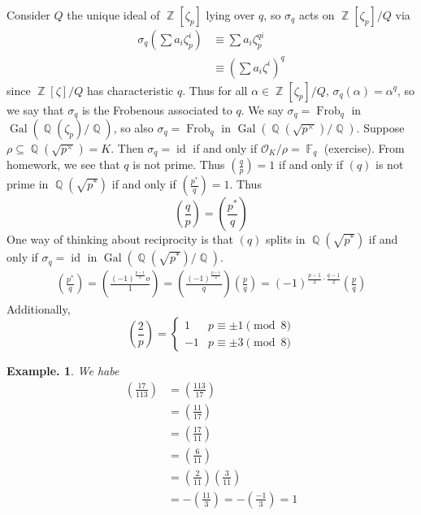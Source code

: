 \documentclass[11pt, a4paper]{memoir}
\DeclareMathOperator{\Q}{{\mathbb{Q}}}
\DeclareMathOperator{\Z}{{\mathbb{Z}}}
\DeclareMathOperator{\F}{{\mathbb{F}}}
\theoremstyle{change}
\theoremstyle{plain}
\theoremstyle{nonumberplain}
\newtheorem{example}{Example.}
\DeclareMathOperator{\Gal}{Gal}
\DeclareMathOperator{\id}{id}
\newcommand{\lgs}[2]{\ensuremath{\left(\frac{#1}{#2}\right)}}
\DeclareMathOperator{\Frob}{Frob}
\begin{document}
Consider $Q$ the unique ideal of $\Z[\zeta_p]$ lying over $q$, so $\sigma_q$ acts on $\Z[\zeta_p]/Q$ via
\begin{align*}
    \sigma_q\left(\sum a_i\zeta_p^i\right)&\equiv\sum a_i\zeta_p^{qi}\\
                                          &\equiv \left(\sum a_i\zeta^i\right)^q
\end{align*}
since $\Z[\zeta]/Q$ has characteristic $q$.
Thus for all $\alpha\in\Z[\zeta_p]/Q$, $\sigma_q(\alpha)=\alpha^q$, so we say that $\sigma_q$ is the Frobenous associated to $q$.
We say $\sigma_q=\Frob_q$ in $\Gal(\Q(\zeta_p)/\Q)$, so also $\sigma_q=\Frob_q$ in $\Gal(\Q(\sqrt{p^\times})/\Q)$.
Suppose $\rho\subseteq\Q(\sqrt{p^\times})=K$.
Then $\sigma_q=\id$ if and only if $\mathcal{O}_K/\rho=\F_q$ (exercise).
From homework, we see that $q$ is not prime.
Thus
$\lgs{q}{p}=1$ if and only if $(q)$ is not prime in $\Q(\sqrt{p^*})$ if and only if $\lgs{p^*}{q}=1$.
Thus
\begin{equation*}
    \lgs{q}{p}=\lgs{p^*}{q}
\end{equation*}
One way of thinking about reciprocity is that $(q)$ splits in $\Q(\sqrt{p^*})$ if and only if $\sigma_q=\id$ in $\Gal(\Q(\sqrt{p^*})/\Q)$.
\begin{align*}
    \lgs{p^*}{q}=\lgs{(-1)^{\frac{p-1}{2}}o}{1}=\lgs{(-1)^{\frac{p-1}{2}}}{q}\lgs{p}{q}=(-1)^{\frac{p-1}{2}\cdot\frac{q-1}{2}}\lgs{p}{q}
\end{align*}
Additionally,
\begin{equation*}
    \lgs{2}{p}=
    \begin{cases}
        1 &p\equiv \pm1\pmod{8}\\
        -1&p\equiv \pm3\pmod{8}
    \end{cases}
\end{equation*}
\begin{example}
    We habe
    \begin{align*}
        \lgs{17}{113} &= \lgs{113}{17}\\
                      &= \lgs{11}{17}\\
                      &= \lgs{17}{11}\\
                      &=\lgs{6}{11}\\
                      &= \lgs{2}{11}\lgs{3}{11}\\
                      &= -\lgs{11}{3}=-\lgs{-1}{3}=1
    \end{align*}
\end{example}
\end{document}

